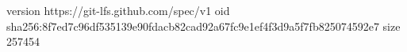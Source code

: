 version https://git-lfs.github.com/spec/v1
oid sha256:8f7ed7c96df535139e90fdacb82cad92a67fc9e1ef4f3d9a5f7fb825074592e7
size 257454
